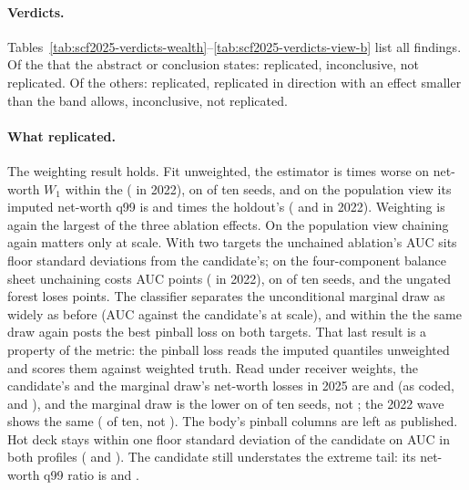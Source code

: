 \paragraph{Verdicts.}
Tables~\ref{tab:scf2025-verdicts-wealth}--\ref{tab:scf2025-verdicts-view-b}
list all  findings. Of the
 that the abstract or conclusion states:
 replicated, 
inconclusive,  not replicated. Of the
 others:  replicated,
 replicated in direction with an effect smaller
than the band allows,  inconclusive,
 not replicated.

\paragraph{What replicated.} The weighting result holds. Fit unweighted, the
estimator is  times worse on net-worth $W_1$
within the \scf{} ( in 2022), on
 of ten seeds, and on the population view its
imputed net-worth q99 is  and
 times the holdout's
( and  in 2022).
Weighting is again the largest of the three ablation effects. On the
population view chaining again matters only at scale. With two targets the unchained ablation's AUC sits
 floor standard deviations from the
candidate's; on the four-component balance sheet unchaining costs
 AUC points
( in 2022), on
 of ten seeds, and the ungated forest
loses  points. The classifier separates the
unconditional marginal draw as widely as before (AUC
 against the candidate's
 at scale), and within the \scf{} the same draw
again posts the best pinball loss on both targets. That last result is a
property of the metric: the pinball loss reads the imputed quantiles
unweighted and scores them against weighted truth. Read under receiver
weights, the candidate's and the marginal draw's net-worth losses in 2025 are
 and
 (as coded,
 and
), and the marginal draw is the
lower on  of ten seeds,
not ; the 2022 wave shows
the same ( of ten, not
). The body's pinball
columns are left as published. Hot deck stays within one
floor standard deviation of the candidate on AUC in both profiles
( and ). The
candidate still understates the extreme tail: its net-worth q99 ratio is
 and .

